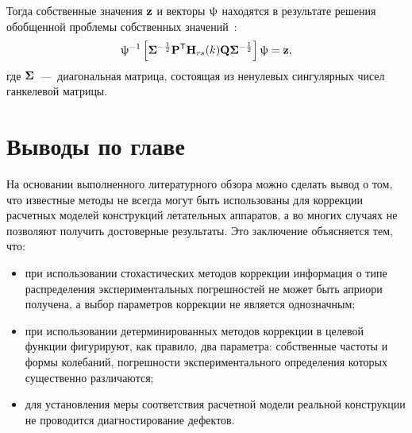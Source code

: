 Тогда собственные значения $ \mathbf{z} $ и векторы $ \mathbf{\uppsi} $ находятся в результате решения обобщенной проблемы собственных значений~\cite{lib:oma:Juang&Pappa}:
\begin{equation}
	\mathbf{\uppsi} ^ {-1} \left[ \mathbf{\Sigma} ^ {-\frac{1}{2}} \mathbf{P} ^ \mathsf{T} \mathbf{H}_{rs}(k) \mathbf{Q} \mathbf{\Sigma} ^ {-\frac{1}{2}} \right] \uppsi = \mathbf{z},
\end{equation}
где $ \mathbf{\Sigma} $~---~диагональная матрица, состоящая из ненулевых сингулярных чисел ганкелевой матрицы.

\section{Выводы по главе \thechapter}

На основании выполненного литературного обзора можно сделать вывод о том, что известные методы не всегда могут быть использованы для коррекции расчетных моделей конструкций летательных аппаратов, а во многих случаях не позволяют получить достоверные результаты. Это заключение объясняется тем, что:
\begin{itemize}
	\item при использовании стохастических методов коррекции информация о типе распределения экспериментальных погрешностей не может быть априори получена, а выбор параметров коррекции не является однозначным;
	\item при использовании детерминированных методов коррекции в целевой функции фигурируют, как правило, два параметра: собственные частоты и формы колебаний, погрешности экспериментального определения которых существенно различаются;
	\item для установления меры соответствия расчетной модели реальной конструкции не проводится диагностирование дефектов. 
\end{itemize}